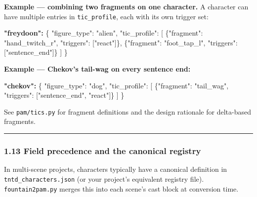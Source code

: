 \documentclass[
  11pt,
]{book}
\newenvironment{Shaded}{}{}
\newcommand{\DataTypeTok}[1]{\textcolor[rgb]{0.56,0.13,0.00}{#1}}
\newcommand{\ErrorTok}[1]{\textcolor[rgb]{1.00,0.00,0.00}{\textbf{#1}}}
\newcommand{\FunctionTok}[1]{\textcolor[rgb]{0.02,0.16,0.49}{#1}}
\newcommand{\OtherTok}[1]{\textcolor[rgb]{0.00,0.44,0.13}{#1}}
\newcommand{\StringTok}[1]{\textcolor[rgb]{0.25,0.44,0.63}{#1}}
\begin{document}
\textbf{Example --- combining two fragments on one character.} A
character can have multiple entries in \texttt{tic\_profile}, each
with its own trigger set:

\begin{Shaded}
\begin{Highlighting}[]
\ErrorTok{"freydoon":} \FunctionTok{\{}
  \DataTypeTok{"figure\_type"}\FunctionTok{:} \StringTok{"alien"}\FunctionTok{,}
  \DataTypeTok{"tic\_profile"}\FunctionTok{:} \OtherTok{[}
    \FunctionTok{\{}\DataTypeTok{"fragment"}\FunctionTok{:} \StringTok{"hand\_twitch\_r"}\FunctionTok{,} \DataTypeTok{"triggers"}\FunctionTok{:} \OtherTok{[}\StringTok{"react"}\OtherTok{]}\FunctionTok{\}}\FunctionTok{,}
    \FunctionTok{\{}\DataTypeTok{"fragment"}\FunctionTok{:} \StringTok{"foot\_tap\_l"}\FunctionTok{,} \DataTypeTok{"triggers"}\FunctionTok{:} \OtherTok{[}\StringTok{"sentence\_end"}\OtherTok{]}\FunctionTok{\}}
  \OtherTok{]}
\FunctionTok{\}}
\end{Highlighting}
\end{Shaded}

\textbf{Example --- Chekov's tail-wag on every sentence end:}

\begin{Shaded}
\begin{Highlighting}[]
\ErrorTok{"chekov":} \FunctionTok{\{}
  \DataTypeTok{"figure\_type"}\FunctionTok{:} \StringTok{"dog"}\FunctionTok{,}
  \DataTypeTok{"tic\_profile"}\FunctionTok{:} \OtherTok{[}
    \FunctionTok{\{}\DataTypeTok{"fragment"}\FunctionTok{:} \StringTok{"tail\_wag"}\FunctionTok{,} \DataTypeTok{"triggers"}\FunctionTok{:} \OtherTok{[}\StringTok{"sentence\_end"}\OtherTok{,} \StringTok{"react"}\OtherTok{]}\FunctionTok{\}}
  \OtherTok{]}
\FunctionTok{\}}
\end{Highlighting}
\end{Shaded}

See \texttt{pam/tics.py} for fragment definitions and the design
rationale for delta-based fragments.

\begin{center}\rule{0.5\linewidth}{0.5pt}\end{center}

\subsubsection{1.13 Field precedence and the canonical
registry}\label{field-precedence-and-the-canonical-registry}

In multi-scene projects, characters typically have a canonical
definition in \texttt{tntd\_characters.json} (or your project's
equivalent registry file). \texttt{fountain2pam.py} merges this into
each scene's cast block at conversion time.
\end{document}
